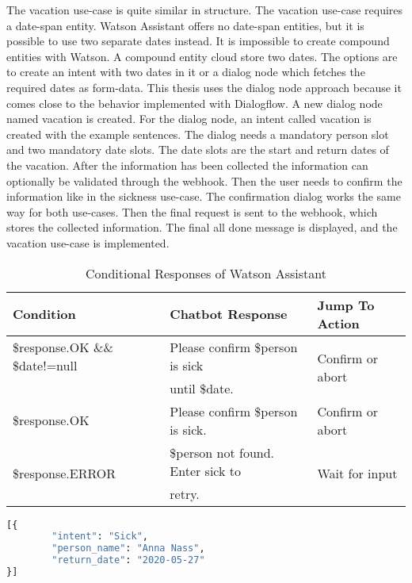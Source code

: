 The vacation use-case is quite similar in structure.
The vacation use-case requires a date-span entity.
Watson Assistant offers no date-span entities, but it is possible to use two separate dates instead.
It is impossible to create compound entities with Watson.
A compound entity cloud store two dates. 
The options are to create an intent with two dates in it or a dialog node 
which fetches the required dates as form-data.
This thesis uses the dialog node approach because it comes close to the 
behavior implemented with Dialogflow.
A new dialog node named vacation is created.
For the dialog node, an intent called vacation is created with 
the example sentences.
The dialog needs a mandatory person slot and two mandatory date slots.
The date slots are the start and return dates of the vacation.
After the information has been collected the information can optionally 
be validated through the webhook.
Then the user needs to confirm the information like in the sickness use-case.
The confirmation dialog works the same way for both use-cases.
Then the final request is sent to the webhook, which stores the collected information.
The final all done message is displayed, and the vacation use-case is implemented.

\begin{table}[H]
    \centering
    \begin{tabular}{ l | l | l  }
  Condition & Chatbot Response & Jump To Action \\ \hline \hline
  \$response.OK \&\& \$date!=null & Please confirm \$person is sick & \multirow{2}{*}{Confirm or abort} \\
        & until \$date. & \\ \hline
  \$response.OK & Please confirm \$person is sick. & Confirm or abort \\ \hline
  \multirow{2}{*}{\$response.ERROR} & \$person not found. Enter sick to & \multirow{2}{*}{Wait for input} \\ 
  &  retry. & \\ \hline

\end{tabular}
    \caption{Conditional Responses of Watson Assistant} \label{tab:watson_cond_response}
\end{table} \noindent


\begin{lstlisting}[caption={Watson Assistant Request Format}, label={lst:watson_request},captionpos=b,frame=single,language={Python},commentstyle=\color{mygreen},keywordstyle=\color{blue},
    morekeywords={}]                
[{
        "intent": "Sick",
        "person_name": "Anna Nass",
        "return_date": "2020-05-27"
}]
\end{lstlisting}  

